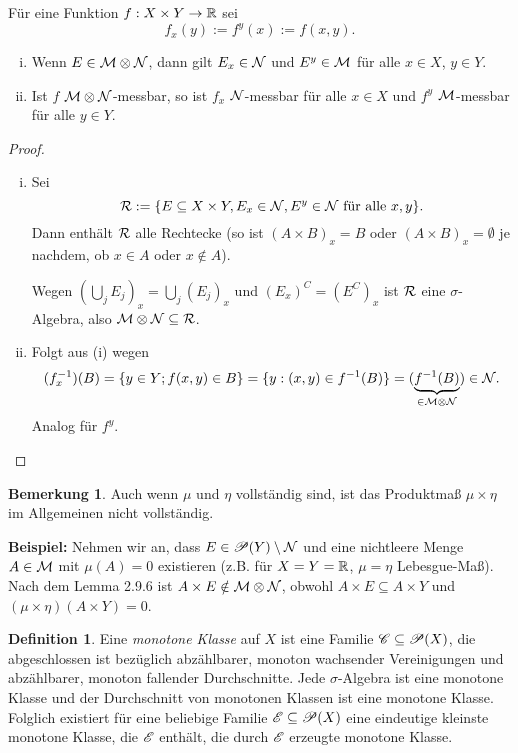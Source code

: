 \documentclass[
 a4paper,
 12pt,
 parskip=half
 ]{scrreprt}
\theoremstyle{plain}
\theoremstyle{definition}
\newtheorem{defn}[thm]{Definition}
\newtheorem{rmrk}[thm]{Bemerkung}
\numberwithin{equation}{section}
\begin{document}
Für eine Funktion $f: X \times Y \to \mathbb{R}$ sei
\[ f_x(y) := f^y(x) := f(x,y). \]

\begin{lem}
 \begin{enumerate}[(i)]
  \item Wenn $E \in \mathcal{M} \otimes \mathcal{N}$, dann gilt $E_x \in \mathcal{N}$ und $E^y \in \mathcal{M}$ für alle $x \in X$, $y \in Y$.
  \item Ist $f$ $\mathcal{M} \otimes \mathcal{N}$-messbar, so ist $f_x$ $\mathcal{N}$-messbar für alle $x \in X$ und $f^y$ $\mathcal{M}$-messbar für alle $y \in Y$.
 \end{enumerate}
\end{lem}

\begin{proof}
 \begin{enumerate}[(i)]
  \item Sei 
   \[ \mathcal{R} := \{ E \subseteq X \times Y, E_x \in \mathcal{N}, E^y \in \mathcal{N} \text{ für alle } x,y \}. \]
   Dann enthält $\mathcal{R}$ alle Rechtecke (so ist $(A \times B)_x = B$ oder $(A \times B)_x = \emptyset$ je nachdem, ob $x \in A$ oder $x \notin A$).
   
   Wegen $(\bigcup_j E_j)_x = \bigcup_j (E_j)_x$ und $(E_x)^C = (E^C)_x$ ist $\mathcal{R}$ eine $\sigma$-Algebra, also $\mathcal{M} \otimes \mathcal{N} \subseteq \mathcal{R}$.
  \item Folgt aus (i) wegen
   \[ (f_x^{-1})(B) = \{ y \in Y; f(x,y) \in B \} = \{ y: (x,y) \in f^{-1}(B) \} = (\underbrace{f^{-1}(B)}_{\in \mathcal{M} \otimes \mathcal{N}}) \in \mathcal{N}. \]
   Analog für $f^y$. \qedhere
 \end{enumerate}
\end{proof}

\begin{rmrk}
 Auch wenn $\mu$ und $\eta$ vollständig sind, ist das Produktmaß $\mu \times \eta$ im Allgemeinen nicht vollständig.
 
 \textbf{Beispiel:} Nehmen wir an, dass $E \in \mathscr{P}(Y) \setminus \mathcal{N}$ und eine nichtleere Menge $A \in \mathcal{M}$ mit $\mu(A) = 0$ existieren (z.B. für $X=Y=\mathbb{R}$, $\mu = \eta$ Lebesgue-Maß). Nach dem Lemma 2.9.6 ist $A \times E \notin \mathcal{M} \otimes \mathcal{N}$, obwohl $A \times E \subseteq A \times Y$ und $(\mu \times \eta)(A \times Y) = 0$.
\end{rmrk}

\begin{defn}
 Eine \emph{monotone Klasse} auf $X$ ist eine Familie $\mathscr{C} \subseteq \mathscr{P}(X)$, die abgeschlossen ist bezüglich abzählbarer, monoton wachsender Vereinigungen und abzählbarer, monoton fallender Durchschnitte. Jede $\sigma$-Algebra ist eine monotone Klasse und der Durchschnitt von monotonen Klassen ist eine monotone Klasse. Folglich existiert für eine beliebige Familie $\mathscr{E} \subseteq \mathscr{P}(X)$ eine eindeutige kleinste monotone Klasse, die $\mathscr{E}$ enthält, die durch $\mathscr{E}$ erzeugte monotone Klasse.
\end{defn}
\end{document}
